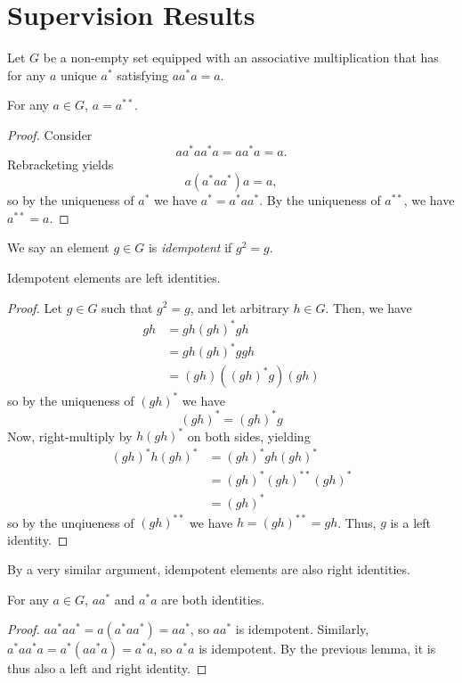 \documentclass[11pt]{article}
\begin{document}
\newpage
\section{Supervision Results}

Let $G$ be a non-empty set
equipped with an associative multiplication
that has for any $a$ unique $a^{*}$ 
satisfying $aa^{*}a = a$.

\begin{lemma}
    For any $a \in G$, $a = a^{**}$.
\end{lemma}
\begin{proof}
    Consider
    \[
        aa^{*}aa^{*}a = aa^{*}a = a.
    \]
    Rebracketing yields
    \[
        a(a^{*}aa^{*})a = a,
    \]
    so by the uniqueness of $a^{*}$ we have $a^{*} = a^{*}aa^{*}$.
    By the uniqueness of $a^{**}$, we have $a^{**} = a$.
\end{proof}

\begin{definition}
    We say an element $g \in G$ is \emph{idempotent}
    if $g^{2} = g$.
\end{definition}

\begin{lemma}
    Idempotent elements are left identities.
\end{lemma}
\begin{proof}
    Let $g \in G$ such that $g^{2} = g$,
    and let arbitrary $h \in G$.
    Then, we have
    \begin{align*}
        gh &= gh(gh)^{*}gh\\
            &= gh(gh)^{*}ggh\\
            &= (gh)((gh)^{*}g)(gh)
    \end{align*}
    so by the uniqueness of $(gh)^{*}$ we have
    \[
        (gh)^{*} = (gh)^{*}g
    \]
    Now, right-multiply by $h(gh)^{*}$ on both sides, yielding
    \begin{align*}
        (gh)^{*}h(gh)^{*} &= (gh)^{*}gh(gh)^{*}\\
                          &= (gh)^{*}(gh)^{**}(gh)^{*}\\
                          &= (gh)^{*}
    \end{align*}
    so by the unqiueness of $(gh)^{**}$ we have $h = (gh)^{**} = gh$.
    Thus, $g$ is a left identity.
\end{proof}

By a very similar argument, idempotent elements are also right identities.

\begin{corollary}
    For any $a \in G$, $aa^{*}$ and $a^{*}a$ are both identities.
\end{corollary}
\begin{proof}
    $aa^{*}aa^{*} = a(a^{*}aa^{*}) = aa^{*}$, so $aa^{*}$ is idempotent.
    Similarly, $a^{*}aa^{*}a = a^{*}(aa^{*}a) = a^{*}a$, so $a^{*}a$ is idempotent.
    By the previous lemma, it is thus also a left and right identity.
\end{proof}
\end{document}
